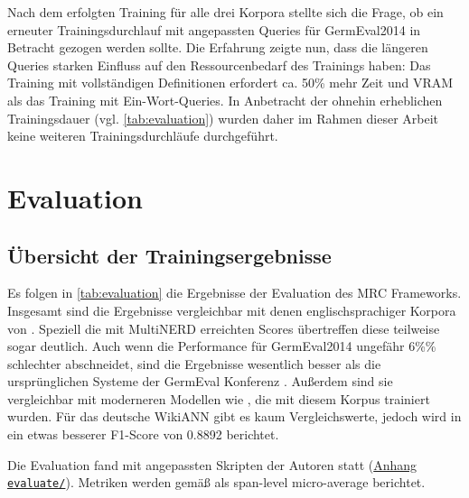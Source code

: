 Nach dem erfolgten Training für alle drei Korpora stellte sich die Frage, ob ein erneuter Trainingsdurchlauf mit angepassten Queries für GermEval2014 in Betracht gezogen werden sollte. Die Erfahrung zeigte nun, dass die längeren Queries starken Einfluss auf den Ressourcenbedarf des Trainings haben: Das Training mit vollständigen Definitionen erfordert ca. 50\% mehr Zeit und VRAM als das Training mit Ein-Wort-Queries. In Anbetracht der ohnehin erheblichen Trainingsdauer (vgl. \autoref{tab:evaluation}) wurden daher im Rahmen dieser Arbeit keine weiteren Trainingsdurchläufe durchgeführt.


\chapter{Evaluation}
\label{ch:Evaluation}

\section{Übersicht der Trainingsergebnisse}
\label{ch:Evaluation:sec:Übersicht_der_Trainingsergebnisse}

Es folgen in \autoref{tab:evaluation} die Ergebnisse der Evaluation des MRC Frameworks. Insgesamt sind die Ergebnisse vergleichbar mit denen englischsprachiger Korpora von . Speziell die mit MultiNERD erreichten Scores übertreffen diese teilweise sogar deutlich. Auch wenn die Performance für GermEval2014 ungefähr 6\%\% schlechter abschneidet, sind die Ergebnisse wesentlich besser als die ursprünglichen Systeme der GermEval Konferenz \parencite{germeval2014}. Außerdem sind sie vergleichbar mit moderneren Modellen wie \textcite{riedl-pado-shootout}, die mit diesem Korpus trainiert wurden. Für das deutsche WikiANN gibt es kaum Vergleichswerte, jedoch wird in \textcite{Schiesser_2023} ein etwas besserer F1-Score von 0.8892 berichtet.

Die Evaluation fand mit angepassten Skripten der Autoren statt (\hyperref[app:evaluate]{Anhang \texttt{evaluate/}}). Metriken werden gemäß \textcite{li2019unified} als span-level micro-average berichtet.

